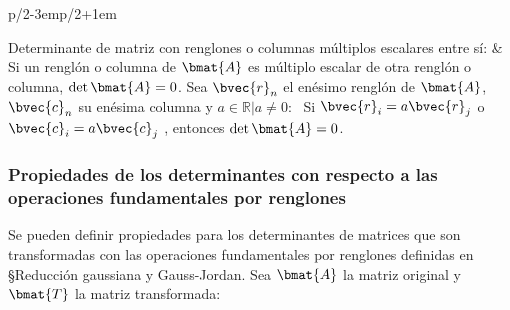 \documentclass{fmbnotes}
\begin{document}
\begin{longtable}{p{}p{}}
	 \\
	\rule[1ex]{0pt}{2.5ex}Determinante de matriz con renglones o columnas múltiplos escalares entre sí: & Si un renglón o columna de \( \bmat{A} \) es múltiplo escalar de otra renglón o columna, \( \det \bmat{A} = 0 \). Sea \( \bvec{r}_{n} \) el enésimo renglón de \( \bmat{A} \), \( \bvec{c}_{n} \) su enésima columna y \(a \in \mathbb{R}| a\neq 0\): \newline \mbox{ }Si 
	\( \bvec{r}_{i} = a\bvec{r}_{j}\) o \(\bvec{c}_{i}  = a\bvec{c}_{j}  \) , entonces  \( \det \bmat{A} = 0 \).\\
\end{longtable}



\subsubsection{Propiedades de los determinantes con respecto a las operaciones fundamentales por renglones}
Se pueden definir propiedades para los determinantes de matrices que son transformadas con las operaciones fundamentales por renglones definidas en \S Reducción gaussiana y Gauss-Jordan. Sea \( \bmat{A} \) la matriz original y \(\bmat{T}\) la matriz transformada:
\end{document}

